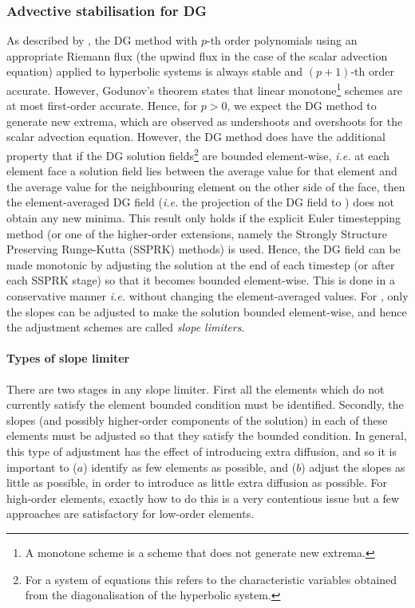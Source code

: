 \subsubsection{Advective stabilisation for DG}

As described by \cite{cockburn2001}, the DG method with $p$-th order
polynomials using an appropriate Riemann flux (the upwind flux in the
case of the scalar advection equation) applied to hyperbolic systems
is always stable and $(p+1)$-th order accurate. However, Godunov's
theorem states that linear monotone\footnote{A monotone scheme is a
  scheme that does not generate new extrema.} schemes are at most
first-order accurate. Hence, for $p>0$, we expect the DG method to
generate new extrema, which are observed as undershoots and overshoots
for the scalar advection equation. However, the DG method does have
the additional property that if the DG solution fields\footnote{For a
  system of equations this refers to the characteristic variables
  obtained from the diagonalisation of the hyperbolic system.} are
bounded element-wise, \emph{i.e.} at each element face a solution
field lies between the average value for that element and the average
value for the neighbouring element on the other side of the face, then
the element-averaged DG field (\emph{i.e.} the projection of the DG
field to \Pzero) does not obtain any new minima. This result only holds if
the explicit Euler timestepping method (or one of the higher-order
extensions, namely the Strongly Structure Preserving Runge-Kutta
(SSPRK) methods) is used. Hence, the DG field can be made monotonic by
adjusting the solution at the end of each timestep (or after each
SSPRK stage) so that it becomes bounded element-wise. This is done in
a conservative manner \emph{i.e.} without changing the element-averaged
values. For \Pone, only the slopes can be adjusted to make the solution
bounded element-wise, and hence the adjustment schemes are called
\emph{slope limiters}.

\paragraph{Types of slope limiter}
\label{sec:ND_DG_slope_limiters}
There are two stages in any slope limiter. First all the elements
which do not currently satisfy the element bounded condition must be
identified. Secondly, the slopes (and possibly higher-order components
of the solution) in each of these elements must be adjusted so that
they satisfy the bounded condition. In general, this type of
adjustment has the effect of introducing extra diffusion, and so it is important to ($a$)
identify as few elements as possible, and ($b$) adjust the slopes as
little as possible, in order to introduce as little extra diffusion as
possible. For high-order elements, exactly how to do this is a very
contentious issue but a few approaches are satisfactory for low-order
elements.


